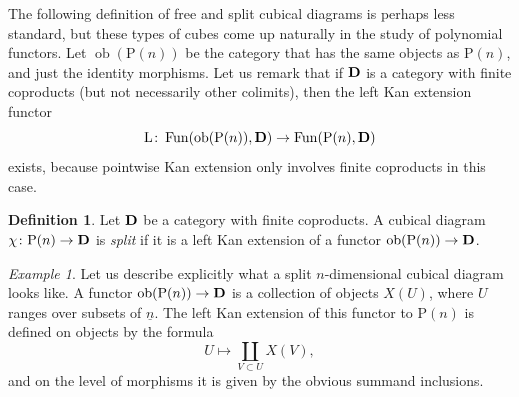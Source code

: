\documentclass[psamsfonts]{amsart}
\theoremstyle{plain}
\theoremstyle{definition}
\newtheorem{defn}[thm]{Definition}
\theoremstyle{remark}
\newtheorem{exmp}[thm]{Example}
\newcommand{\catname}[1]{{\normalfont\textbf{#1}}}
\newcommand{\ob}{\operatorname{ob}}
\newcommand{\lkan}{\mathrm{L}}
\newcommand{\power}{\mathrm{P}}
\DeclareMathOperator{\fun}{Fun}
\begin{document}
The following definition of free and split cubical diagrams is perhaps less standard, but these types of cubes come up naturally in the study of polynomial functors. Let $\ob(\power(n))$ be the category that has the same objects as $\power(n)$, and just the identity morphisms. Let us remark that if $\catname{D}$ is a category with finite coproducts (but not necessarily other colimits), then the left Kan extension functor 
\[
\lkan\colon \fun(\ob(\power(n)), \catname{D})\to\fun(\power(n), \catname{D})
\]
exists, because pointwise Kan extension only involves finite coproducts in this case.
\begin{defn}\label{def:split}
Let $\catname{D}$ be a category with finite coproducts. A cubical diagram $\chi\colon\power(n)\to \catname{D}$ is {\it split} if it is a left Kan extension of a functor $\ob(\power(n))\to \catname{D}$. 
%
\end{defn}
\begin{exmp}\label{example:split}
Let us describe explicitly what a split $n$-dimensional cubical diagram looks like. A functor $\ob(\power(n))\to\catname{D}$ is a collection of objects $X(U)$, where $U$ ranges over subsets of $\underline{n}$. The left Kan extension of this functor to $\power(n)$ is defined on objects by the formula
\begin{equation}\label{eq:general split}
U\mapsto \coprod_{V\subset U} X(V),
\end{equation}
and on the level of morphisms it is given by the obvious summand inclusions.
\end{exmp}
\end{document}
